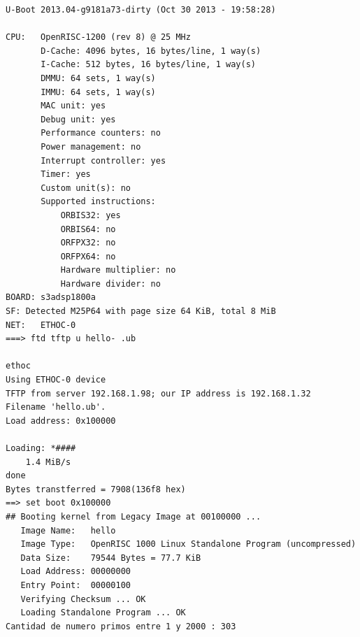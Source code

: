 \newpage		
\begin{lstlisting}[frame=single,caption={Salida de la ejecución del programa de prueba cargado por uboot},label={lst:salidauboot}]
U-Boot 2013.04-g9181a73-dirty (Oct 30 2013 - 19:58:28)

CPU:   OpenRISC-1200 (rev 8) @ 25 MHz
       D-Cache: 4096 bytes, 16 bytes/line, 1 way(s)
       I-Cache: 512 bytes, 16 bytes/line, 1 way(s)
       DMMU: 64 sets, 1 way(s)
       IMMU: 64 sets, 1 way(s)
       MAC unit: yes
       Debug unit: yes
       Performance counters: no
       Power management: no
       Interrupt controller: yes
       Timer: yes
       Custom unit(s): no
       Supported instructions:
           ORBIS32: yes
           ORBIS64: no
           ORFPX32: no
           ORFPX64: no
           Hardware multiplier: no
           Hardware divider: no
BOARD: s3adsp1800a
SF: Detected M25P64 with page size 64 KiB, total 8 MiB
NET:   ETHOC-0
===> ftd tftp u hello- .ub

ethoc
Using ETHOC-0 device
TFTP from server 192.168.1.98; our IP address is 192.168.1.32
Filename 'hello.ub'.
Load address: 0x100000

Loading: *####
	1.4 MiB/s
done 
Bytes transtferred = 7908(136f8 hex)
==> set boot 0x100000
## Booting kernel from Legacy Image at 00100000 ...
   Image Name:   hello
   Image Type:   OpenRISC 1000 Linux Standalone Program (uncompressed)
   Data Size:    79544 Bytes = 77.7 KiB
   Load Address: 00000000
   Entry Point:  00000100
   Verifying Checksum ... OK
   Loading Standalone Program ... OK
Cantidad de numero primos entre 1 y 2000 : 303

\end{lstlisting}
		
